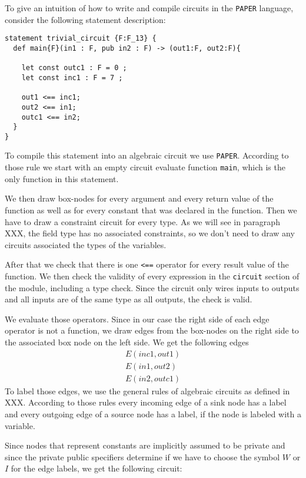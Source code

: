 \begin{example} To give an intuition of how to write and compile circuits in the \texttt{PAPER} language, consider the following statement description:
\begin{lstlisting}
statement trivial_circuit {F:F_13} {
  def main{F}(in1 : F, pub in2 : F) -> (out1:F, out2:F){

    let const outc1 : F = 0 ;   
    let const inc1 : F = 7 ;

    out1 <== inc1;
    out2 <== in1;
    outc1 <== in2;
  }
}
\end{lstlisting} 
To compile this statement into an algebraic circuit we use \texttt{PAPER}. According to those rule we start with an empty circuit evaluate function \texttt{main}, which is the only function in this statement. 

We then draw box-nodes for every argument and every return value of the function as well as for every constant that was declared in the function. Then we have to draw a constraint circuit for every type. As we will see in paragraph XXX, the field type has no associated constraints, so we don't need to draw any circuits associated the types of the variables. 

After that we check that there is one \texttt{<==} operator for every result value of the function. We then check the validity of every expression in the \texttt{circuit} section of the module, including a type check. Since the circuit only wires inputs to outputs and all inputs are of the same type as all outputs, the check is valid.

We evaluate those operators. Since in our case the right side of each edge operator is not a function, we draw edges from the box-nodes on the right side to the associated box node on the left side. We get the following edges
\begin{align*}
E(inc1, out1) \\
E(in1, out2) \\
E(in2, outc1)
\end{align*}
To label those edges, we use the general rules of algebraic circuits as defined in XXX. According to those rules every incoming edge of a sink node has a label and every outgoing edge of a source node has a label, if the node is labeled with a variable.

Since nodes that represent constants are implicitly assumed to be private and since the private public specifiers determine if we have to choose the symbol $W$ or $I$ for the edge labels, we get the following circuit:
\begin{center}
\end{center}
\end{example}
